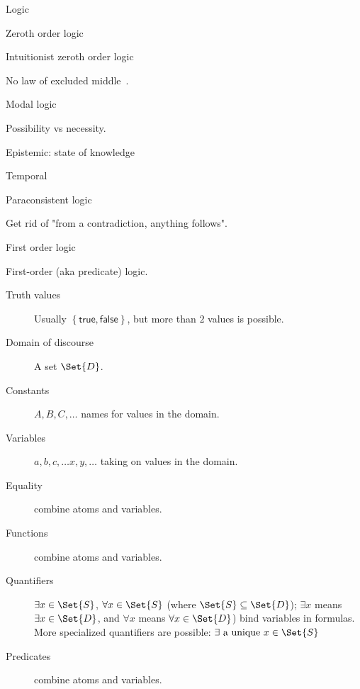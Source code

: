 \begin{plSection}{Logic}
\begin{plSection}{Zeroth order logic}
\begin{plSection}{Intuitionist zeroth order logic}

No law of excluded middle~.

\end{plSection}%
\end{plSection}%
\begin{plSection}{Modal logic}
\label{sec:Modal_logic}


Possibility vs necessity.

Epistemic: state of knowledge

Temporal 

\end{plSection}%
\begin{plSection}{Paraconsistent logic}
\label{sec:Paraconsistent_logic}


Get rid of "from a contradiction, anything follows".
\end{plSection}%
\begin{plSection}{First order logic}
\label{sec:First_order_logic}

First-order (aka predicate) logic.~

\begin{description}
\item[Truth values] Usually $\left\{\mathsf{true},\mathsf{false}\right\}$,
but more than $2$ values is possible.
\item[Domain of discourse] A set $\Set{D}$.
\item[Constants] $A,B,C, \ldots$ names for values in the
domain.
\item[Variables] $a,b,c, \ldots x,y,\dots$ taking on values in the
domain.~
\item[Equality] combine atoms and variables.
\item[Functions] combine atoms and variables.
\item[Quantifiers]   
$\exists x \in \Set{S}$, $\forall x \in \Set{S}$ 
(where $\Set{S} \subseteq \Set{D}$);
$\exists x$ means $\exists x \in \Set{D}$, 
and
$\forall x$ means $\forall x \in \Set{D}$) 
bind variables in
formulas.~
More specialized quantifiers are possible:
$\exists \textrm{ a unique } x \in \Set{S}$
\item[Predicates] combine atoms and variables.
\end{description} 


\end{plSection}
\end{plSection}
